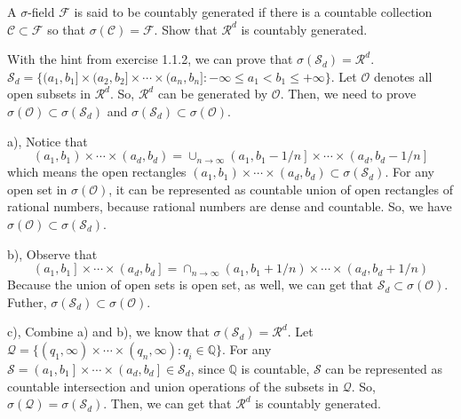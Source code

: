 \documentclass[en, normal, 11pt, black]{elegantnote}
\newenvironment{exercise}[1]{\begin{tcolorbox}[colback=black!15, colframe=black!80, breakable, title=#1]}{\end{tcolorbox}}
\renewenvironment{proof}{\begin{tcolorbox}[colback=white, colframe=black!50, breakable, title=Proof. ]\setlength{\parskip}{0.8em}}{\\\rightline{$\square$}\end{tcolorbox}}
\begin{document}
    \begin{exercise}{1.1.3}
        A $\sigma$-field $\mathcal{F}$ is said to be countably generated if there is a countable collection $\mathcal{C} \subset \mathcal{F}$ so that $\sigma(\mathcal{C}) = \mathcal{F}$. Show that $\mathcal{R}^d$ is countably generated. 
    \end{exercise}
    \begin{proof}
        With the hint from exercise 1.1.2, we can prove that $\sigma(\mathcal{S}_d)=\mathcal{R}^d$. \(\mathcal{S}_d=\{(a_1, b_1]\times(a_2,b_2]\times\cdots\times(a_n,b_n]:-\infty\le a_1<b_1\le +\infty\}\). Let $\mathcal{O}$ denotes all open subsets in $\mathcal{R}^d$. So, $\mathcal{R}^d$ can be generated by $\mathcal{O}$. Then, we need to prove $\sigma(\mathcal{O})\subset \sigma(\mathcal{S}_d)$ and $\sigma(\mathcal{S}_d)\subset \sigma(\mathcal{O})$. 

        a), Notice that 
        \[\left(a_1, b_{1}\right) \times \cdots \times\left(a_{d}, b_{d}\right)=\cup_{n\to\infty}\left(a_1, b_{1}-1 / n\right]\times \cdots \times\left(a_{d}, b_{d}-1 / n\right]\]
        which means the open rectangles $\left(a_1, b_{1}\right) \times \cdots \times\left(a_{d}, b_{d}\right)\subset \sigma(\mathcal{S}_d)$. For any open set in $\sigma(\mathcal{O})$, it can be represented as countable union of open rectangles of rational numbers, because rational numbers are dense and countable. So, we have $\sigma(\mathcal{O})\subset\sigma(\mathcal{S}_d)$. 

        b), Observe that
        \[\left(a_1, b_{1}\right] \times \cdots \times\left(a_{d}, b_{d}\right]=\cap_{n\to\infty}\left(a_1, b_{1}+1 / n\right)\times \cdots \times\left(a_{d}, b_{d}+1 / n\right)\]
        Because the union of open sets is open set, as well, we can get that $\mathcal{S}_d\subset\sigma(\mathcal{O})$. Futher, $\sigma(\mathcal{S}_d)\subset \sigma(\mathcal{O})$. 

        c), Combine a) and b), we know that $\sigma(\mathcal{S}_d)=\mathcal{R}^d$. Let $\mathcal{Q}=\{(q_1, \infty)\times\cdots\times(q_n, \infty):q_i\in\mathbb{Q}\}$. For any $\mathcal{S}=\left(a_1, b_{1}\right] \times \cdots \times\left(a_{d}, b_{d}\right]\in\mathcal{S}_d$, since $\mathbb{Q}$ is countable, $\mathcal{S}$ can be represented as countable intersection and union operations of the subsets in $\mathcal{Q}$. So, $\sigma(\mathcal{Q})=\sigma(\mathcal{S}_d)$. Then, we can get that $\mathcal{R}^d$ is countably generated. 
    \end{proof}
\end{document}
